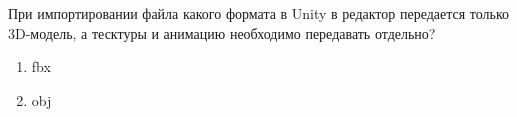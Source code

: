 
При импортировании файла какого формата в Unity в редактор передается только 3D-модель, а тесктуры и анимацию необходимо передавать отдельно?

\begin{enumerate}
    \item fbx
    \item obj
\end{enumerate}

